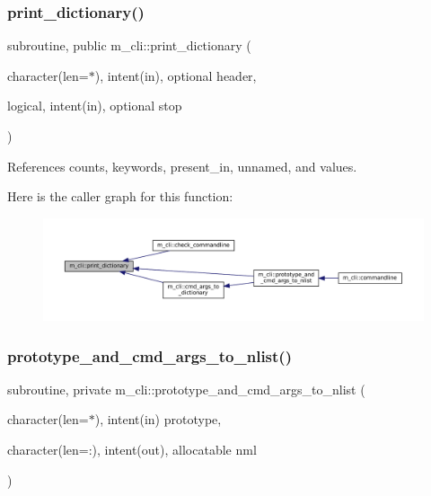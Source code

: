 \subsubsection{\texorpdfstring{print\+\_\+dictionary()}{print\_dictionary()}}
{\footnotesize\ttfamily subroutine, public m\+\_\+cli\+::print\+\_\+dictionary (\begin{DoxyParamCaption}\item[{character(len=$\ast$), intent(in), optional}]{header,  }\item[{logical, intent(in), optional}]{stop }\end{DoxyParamCaption})}



References counts, keywords, present\+\_\+in, unnamed, and values.

Here is the caller graph for this function\+:\nopagebreak
\begin{figure}[H]
\begin{center}
\leavevmode
\includegraphics[width=350pt]{namespacem__cli_a5b6abaf1d5aec5e918be0759df29c849_icgraph}
\end{center}
\end{figure}
\mbox{\label{namespacem__cli_ac77d70573b34ade2079cc4004a6acba5}} 
\subsubsection{\texorpdfstring{prototype\+\_\+and\+\_\+cmd\+\_\+args\+\_\+to\+\_\+nlist()}{prototype\_and\_cmd\_args\_to\_nlist()}}
{\footnotesize\ttfamily subroutine, private m\+\_\+cli\+::prototype\+\_\+and\+\_\+cmd\+\_\+args\+\_\+to\+\_\+nlist (\begin{DoxyParamCaption}\item[{character(len=$\ast$), intent(in)}]{prototype,  }\item[{character(len=\+:), intent(out), allocatable}]{nml }\end{DoxyParamCaption})\hspace{0.3cm}{\ttfamily [private]}}



